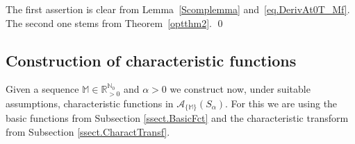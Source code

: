 \documentclass[11pt,a4paper]{article}
\theoremstyle{plain}
\theoremstyle{definition}
\newcommand{\RR}{\mathbb{R}}
\newcommand{\NN}{\mathbb{N}}
\newcommand{\red}[1]{{\color{red}#1}}
\newcommand{\M}{\mathbb{M}}
\newcommand{\LL}{\mathbb{L}}
\newcommand{\G}{\mathbb{G}}
\begin{document}
The first assertion is clear from Lemma~\ref{Scomplemma} and~\eqref{eq.DerivAt0T_Mf}. The second one stems from Theorem~\ref{optthm2}.
\qed\enddemo

\subsection{Construction of characteristic functions}\label{ssect.ConstrCharactFunct}
Given a sequence $\M\in\RR_{>0}^{\NN_0}$ and $\alpha>0$ we construct now, under suitable assumptions, characteristic functions in $\mathcal{A}_{\{\M\}} (S_{\alpha})$.
For this we are using the basic functions from Subsection \ref{ssect.BasicFct} and the characteristic transform from Subsection \ref{ssect.CharactTransf}.\vspace{6pt}
%
%
%



\end{document}
